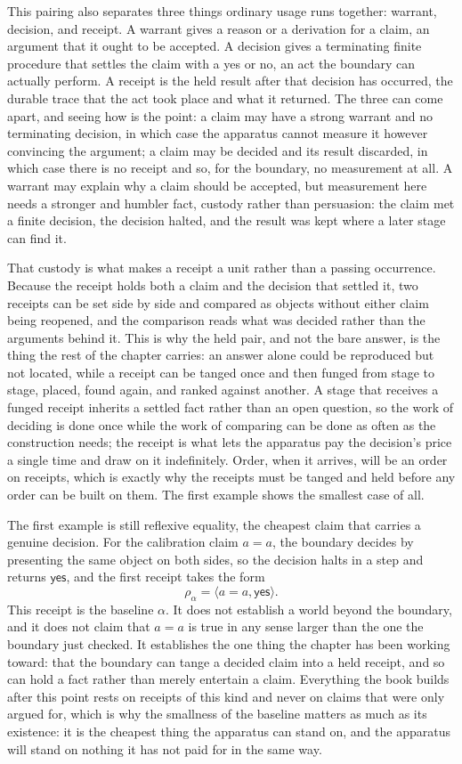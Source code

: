 This pairing also separates three things ordinary usage runs together: warrant, decision, and receipt. A warrant gives a reason or a derivation for a claim, an argument that it ought to be accepted. A decision gives a terminating finite procedure that settles the claim with a yes or no, an act the boundary can actually perform. A receipt is the held result after that decision has occurred, the durable trace that the act took place and what it returned. The three can come apart, and seeing how is the point: a claim may have a strong warrant and no terminating decision, in which case the apparatus cannot measure it however convincing the argument; a claim may be decided and its result discarded, in which case there is no receipt and so, for the boundary, no measurement at all. A warrant may explain why a claim should be accepted, but measurement here needs a stronger and humbler fact, custody rather than persuasion: the claim met a finite decision, the decision halted, and the result was kept where a later stage can find it.

That custody is what makes a receipt a unit rather than a passing occurrence. Because the receipt holds both a claim and the decision that settled it, two receipts can be set side by side and compared as objects without either claim being reopened, and the comparison reads what was decided rather than the arguments behind it. This is why the held pair, and not the bare answer, is the thing the rest of the chapter carries: an answer alone could be reproduced but not located, while a receipt can be tanged once and then funged from stage to stage, placed, found again, and ranked against another. A stage that receives a funged receipt inherits a settled fact rather than an open question, so the work of deciding is done once while the work of comparing can be done as often as the construction needs; the receipt is what lets the apparatus pay the decision's price a single time and draw on it indefinitely. Order, when it arrives, will be an order on receipts, which is exactly why the receipts must be tanged and held before any order can be built on them. The first example shows the smallest case of all.

The first example is still reflexive equality, the cheapest claim that carries a genuine decision. For the calibration claim \(a=a\), the boundary decides by presenting the same object on both sides, so the decision halts in a step and returns \(\mathsf{yes}\), and the first receipt takes the form
\[
  \rho_\alpha = \langle a=a,\mathsf{yes}\rangle .
\]
This receipt is the baseline \(\alpha\). It does not establish a world beyond the boundary, and it does not claim that \(a=a\) is true in any sense larger than the one the boundary just checked. It establishes the one thing the chapter has been working toward: that the boundary can tange a decided claim into a held receipt, and so can hold a fact rather than merely entertain a claim. Everything the book builds after this point rests on receipts of this kind and never on claims that were only argued for, which is why the smallness of the baseline matters as much as its existence: it is the cheapest thing the apparatus can stand on, and the apparatus will stand on nothing it has not paid for in the same way.

